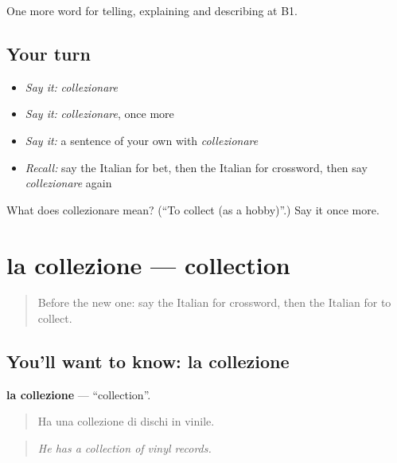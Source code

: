 \begin{grammarlens}[title={What you've built}]
One more word for telling, explaining and describing at B1.
\end{grammarlens}

\subsection*{Your turn}
\begin{itemize}
\raggedright
  \item \emph{Say it:} \emph{collezionare}
  \item \emph{Say it:} \emph{collezionare}, once more
  \item \emph{Say it:} a sentence of your own with \emph{collezionare}
  \item \emph{Recall:} say the Italian for bet, then the Italian for crossword, then say \emph{collezionare} again
\end{itemize}

\begin{tcolorbox}[breakable,colback=teal!4,colframe=teal!35!black,title={Before you move on}]
What does collezionare mean? (\textquotedblleft{}To collect (as a hobby)\textquotedblright{}.) Say it once more.
\end{tcolorbox}
\section[la collezione]{la collezione — collection}

\label{lesson:IT-C505-collezione}



\begin{quote}
Before the new one: say the Italian for crossword, then the Italian for to collect.
\end{quote}

\subsection*{You'll want to know: la collezione}
\textbf{la collezione} — \textquotedblleft{}collection\textquotedblright{}.

\begin{quote}
Ha una collezione di dischi in vinile.
\end{quote}

\begin{quote}
\emph{He has a collection of vinyl records.}
\end{quote}

